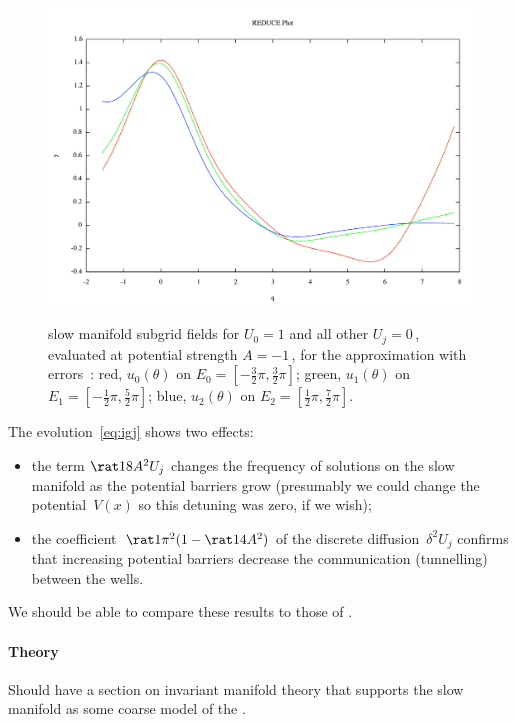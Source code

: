 \documentclass[12pt,a5paper]{article}
\begin{document}
\begin{figure}
\centering
\includegraphics[width=\linewidth]{subgridGam4Am1}\\
\caption{slow manifold subgrid fields for \(U_0=1\) and all other \(U_j=0\)\,, evaluated at potential strength \(A=-1\)\,, for the approximation with errors~: 
red, \(u_0(\theta)\) on \(E_0=[-\frac32\pi,\frac32\pi]\);
green, \(u_1(\theta)\) on \(E_1=[-\frac12\pi,\frac52\pi]\);
blue, \(u_2(\theta)\) on \(E_2=[\frac12\pi,\frac72\pi]\).}
\label{fig:subgrid}
\end{figure}

The evolution~\eqref{eq:igj} shows two effects:
\begin{itemize}
\item the term  \(\rat18A^2 U_j\) changes the frequency of solutions on the slow manifold as the potential barriers grow (presumably we could change the potential~\(V(x)\) so this detuning was zero, if we wish);
\item  the coefficient~\(\rat1{\pi^2}(1-\rat1{4}A^2)\) of the discrete diffusion~\(\delta^2U_j\) confirms that increasing potential barriers decrease the communication (tunnelling) between the wells.
\end{itemize}

We should be able to compare these results to those of \cite{Alfimov2002}.



\paragraph{Theory}  Should have a section on invariant manifold theory that supports the slow manifold as some coarse model of the \pde.
\end{document}
